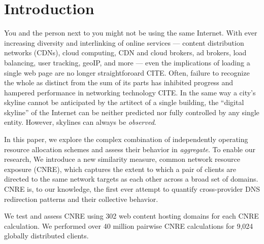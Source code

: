 \section{Introduction} \label{sect:intro}

You and the person next to you might not be using the same Internet. With
ever increasing diversity and interlinking of online services  --- content distribution networks (CDNs), cloud computing, CDN and
cloud brokers, ad brokers, load balancing, user tracking, geoIP, and more --- even the
implications
of loading a single web page are no longer straightforoard CITE. Often, failure to
recognize the whole as distinct from the sum of its parts has inhibited progress
and hampered performance in networking technology CITE. In the same way a city's
skyline cannot be anticipated by the artitect of a single  building, the
``digital skyline'' of the Internet can be neither predicted nor fully
controlled by any single entity.
However, skylines can always be \emph{observed}.

In this paper, we explore the complex combination of independently operating
resource allocation schemes and assess their behavior in \emph{aggregate}. To
enable our research, We introduce a new similarity measure, common network
resource exposure (CNRE), which captures the extent to which a pair of clients
are directed to the same network targets as each other across a broad set of
domains. CNRE is, to our knowledge, the first ever attempt to quantify
cross-provider DNS redirection patterns and their collective behavior. 

We test
and assess CNRE using 302 web content hosting domains for each CNRE calculation.
We performed over 40 million pairwise CNRE calculations for 9,024 globally
distributed clients. 


